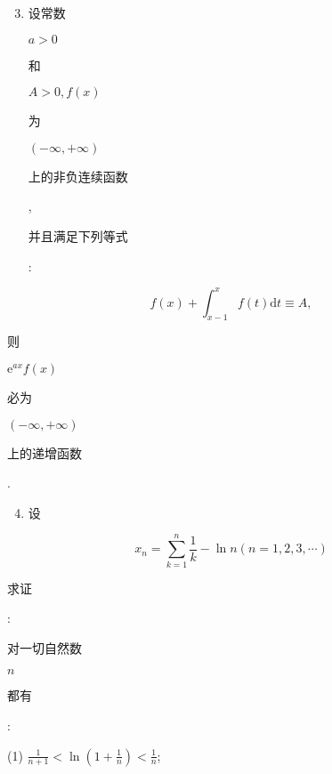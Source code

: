 \documentclass[10pt]{article}
\begin{document}
\begin{enumerate}
  \setcounter{enumi}{2}
  \item \begin{CJK}{UTF8}{mj}设常数\end{CJK} $a>0$ \begin{CJK}{UTF8}{mj}和\end{CJK} $A>0, f(x)$ \begin{CJK}{UTF8}{mj}为\end{CJK} $(-\infty,+\infty)$ \begin{CJK}{UTF8}{mj}上的非负连续函数\end{CJK}, \begin{CJK}{UTF8}{mj}并且满足下列等式\end{CJK}:
\end{enumerate}
$$
f(x)+\int_{x-1}^{x} f(t) \mathrm{d} t \equiv A,
$$
\begin{CJK}{UTF8}{mj}则\end{CJK} $\mathrm{e}^{a x} f(x)$ \begin{CJK}{UTF8}{mj}必为\end{CJK} $(-\infty,+\infty)$ \begin{CJK}{UTF8}{mj}上的递增函数\end{CJK}.

\begin{enumerate}
  \setcounter{enumi}{3}
  \item \begin{CJK}{UTF8}{mj}设\end{CJK}
\end{enumerate}
$$
x_{n}=\sum_{k=1}^{n} \frac{1}{k}-\ln n(n=1,2,3, \cdots)
$$
\begin{CJK}{UTF8}{mj}求证\end{CJK}: \begin{CJK}{UTF8}{mj}对一切自然数\end{CJK} $n$ \begin{CJK}{UTF8}{mj}都有\end{CJK}:

(1) $\frac{1}{n+1}<\ln \left(1+\frac{1}{n}\right)<\frac{1}{n}$;
\end{document}
